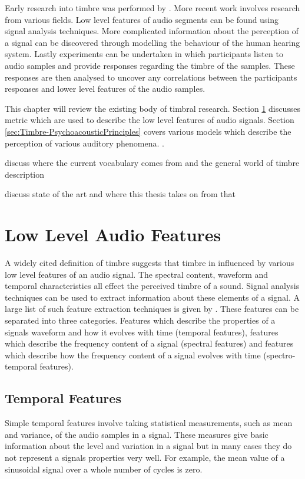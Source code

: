 	Early research into timbre was performed by \citet{helmholtz1875on}. More recent work involves research from various
	fields. Low level features of audio segments can be found using signal analysis techniques. More complicated
	information about the perception of a signal can be discovered through modelling the behaviour of the human hearing
	system. Lastly experiments can be undertaken in which participants listen to audio samples and provide responses
	regarding the timbre of the samples. These responses are then analysed to uncover any correlations between the
	participants responses and lower level features of the audio samples.

	This chapter will review the existing body of timbral research. Section \ref{sec:Timbre-LowLevelFeatures} discusses
	metric which are used to describe the low level features of audio signals. Section
	\ref{sec:Timbre-PsychoacousticPrinciples} covers various models which describe the perception of various auditory
	phenomena. .

	\note
	{
		discuss where the current vocabulary comes from and the general world of timbre description

		discuss state of the art and where this thesis takes on from that
	}

\section{Low Level Audio Features}
\label{sec:Timbre-LowLevelFeatures}
	A widely cited definition of timbre \citep{ASA1960american} suggests that timbre in influenced by various low level
	features of an audio signal. The spectral content, waveform and temporal characteristics all effect the perceived
	timbre of a sound. Signal analysis techniques can be used to extract information about these elements of a signal.
	A large list of such feature extraction techniques is given by \citep{peeters2004a}. These features can be
	separated into three categories. Features which describe the properties of a signals waveform and how it evolves
	with time (temporal features), features which describe the frequency content of a signal (spectral features) and
	features which describe how the frequency content of a signal evolves with time (spectro-temporal features). 

	\subsection{Temporal Features}
	\label{sec:Timbre-LowLevelFeatures-Temporal}
		Simple temporal features involve taking statistical measurements, such as mean and variance, of the audio
		samples in a signal. These measures give basic information about the level and variation in a signal but in
		many cases they do not represent a signals properties very well. For example, the mean value of a sinusoidal
		signal over a whole number of cycles is zero. 

